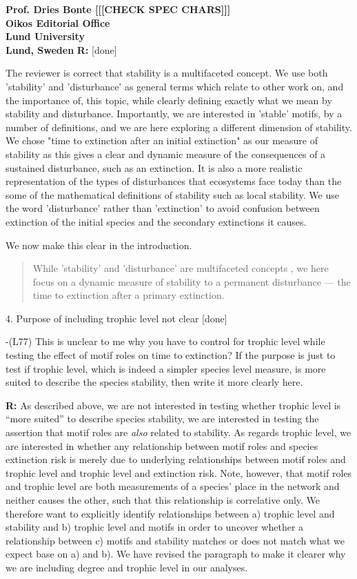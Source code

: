 \documentclass[12pt]{letter}
\begin{document}
\begin{letter}{\bf Prof. Dries Bonte [[[CHECK SPEC CHARS]]]\\
Oikos Editorial Office \\
Lund University \\
Lund, Sweden}
      \textbf{R:} [done]
      
      The reviewer is correct that stability is a multifaceted concept. We use both 'stability' and 'disturbance' as general terms which relate to other work on, and the importance of, this topic, while clearly defining exactly what we mean by stability and disturbance. Importantly, we are interested in 'stable' motifs, by a number of definitions, and we are here exploring a different dimension of stability. We chose "time to extinction after an initial extinction" as our measure of stability as this gives a clear and dynamic measure of the consequences of a sustained disturbance, such as an extinction. It is also a more realistic representation of the types of disturbances that ecosystems face today than the some of the mathematical definitions of stability such as local stability. We use the word 'disturbance' rather than 'extinction' to avoid confusion between extinction of the initial species and the secondary extinctions it causes. 
      
      We now make this clear in the introduction.
      
      \begin{quotation}
	While 'stability' and 'disturbance' are multifaceted concepts \citep{Donahue2013,Radchuck2019}, we here focus on a dynamic measure of stability to a permanent disturbance --- the time to extinction after a primary extinction. 
      \end{quotation}


    4. Purpose of including trophic level not clear [done]

        -(L77) This is unclear to me why you have to control for trophic level while testing the effect of motif roles on time to extinction? If the purpose is just to test if trophic level, which is indeed a simpler species level measure, is more suited to describe the species stability, then write it more clearly here.
        
        \textbf{R:} As described above, we are not interested in testing whether trophic level is ``more suited'' to describe species stability, we are interested in testing the assertion that motif roles are \emph{also} related to stability.
        As regards trophic level, we are interested in whether any relationship between motif roles and species extinction risk is merely due to underlying relationships between motif roles and trophic level and trophic level and extinction risk.
        Note, however, that motif roles and trophic level are both measurements of a species' place in the network and neither causes the other, such that this relationship is correlative only.
        We therefore want to explicitly identify relationships between a) trophic level and stability and b) trophic level and motifs in order to uncover whether a relationship between c) motifs and stability matches or does not match what we expect base on a) and b).
        We have revised the paragraph to make it clearer why we are including degree and trophic level in our analyses.


\end{letter}
\end{document}
